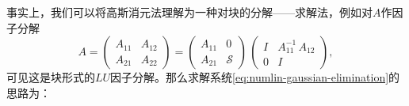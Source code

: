 事实上，我们可以将高斯消元法理解为一种对块的分解——求解法，例如对$A$作因子分解
\begin{equation*}
  A =
  \begin{pmatrix}
    A_{11} & A_{12} \\
    A_{21} & A_{22}
  \end{pmatrix}
  = \begin{pmatrix}
  A_{11} & 0 \\
  A_{21} & \mathcal{S}
  \end{pmatrix}
  \,
  \begin{pmatrix}
    I & A_{11}^{-1} \, A_{12} \\
    0 & I
  \end{pmatrix},
\end{equation*}
可见这是块形式的$LU$因子分解。那么求解系统\eqref{eq:numlin-gaussian-elimination}的思路为：
